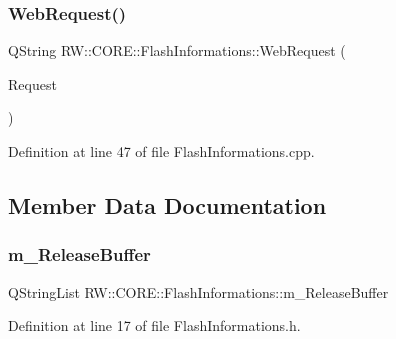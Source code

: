\subsubsection{\texorpdfstring{Web\+Request()}{WebRequest()}}
{\footnotesize\ttfamily Q\+String R\+W\+::\+C\+O\+R\+E\+::\+Flash\+Informations\+::\+Web\+Request (\begin{DoxyParamCaption}\item[{Q\+Network\+Request \&}]{Request }\end{DoxyParamCaption})\hspace{0.3cm}{\ttfamily [private]}}



Definition at line 47 of file Flash\+Informations.\+cpp.



\subsection{Member Data Documentation}
\hypertarget{class_r_w_1_1_c_o_r_e_1_1_flash_informations_a03b8c748a630e47e5310ba4bbd8bd3fa}{}\label{class_r_w_1_1_c_o_r_e_1_1_flash_informations_a03b8c748a630e47e5310ba4bbd8bd3fa} 
\subsubsection{\texorpdfstring{m\+\_\+\+Release\+Buffer}{m\_ReleaseBuffer}}
{\footnotesize\ttfamily Q\+String\+List R\+W\+::\+C\+O\+R\+E\+::\+Flash\+Informations\+::m\+\_\+\+Release\+Buffer\hspace{0.3cm}{\ttfamily [private]}}



Definition at line 17 of file Flash\+Informations.\+h.

\hypertarget{class_r_w_1_1_c_o_r_e_1_1_flash_informations_a710529bd946b8189fae80e14c1c74599}{}\label{class_r_w_1_1_c_o_r_e_1_1_flash_informations_a710529bd946b8189fae80e14c1c74599} 
